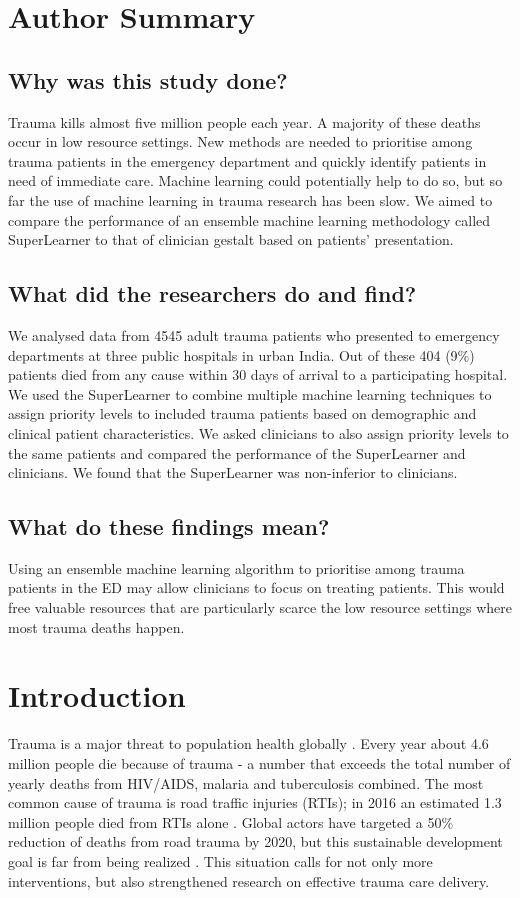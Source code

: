 \documentclass[10pt,letterpaper]{article}\usepackage[]{graphicx}\usepackage[]{color}
\begin{document}
\section*{Author Summary}
\subsection*{Why was this study done?}
Trauma kills almost five million people each year. A majority of these deaths
occur in low resource settings. New methods are needed to prioritise among
trauma patients in the emergency department and quickly identify patients in
need of immediate care. Machine learning could potentially help to do so, but so
far the use of machine learning in trauma research has been slow. We aimed to
compare the performance of an ensemble machine learning methodology called
SuperLearner to that of clinician gestalt based on patients’ presentation.

\subsection*{What did the researchers do and find?}
We analysed data from 4545 adult trauma
patients who presented to emergency departments at three public hospitals in
urban India. Out of these 404 (9\%) patients died from any
cause within 30 days of arrival to a participating hospital. We used the
SuperLearner to combine multiple machine learning techniques to assign priority
levels to included trauma patients based on demographic and clinical patient
characteristics. We asked clinicians to also assign priority levels to the same
patients and compared the performance of the SuperLearner and clinicians. We
found that the SuperLearner was non-inferior to clinicians.

\subsection*{What do these findings mean?}
Using an ensemble machine learning algorithm to prioritise among trauma patients
in the ED may allow clinicians to focus on treating patients. This would free
valuable resources that are particularly scarce the low resource settings where
most trauma deaths happen.

\linenumbers

\section*{Introduction}
Trauma is a major threat to population health globally
\cite{Brohi2017,GBD2017}. Every year about 4.6 million people die because of
trauma - a number that exceeds the total number of yearly deaths from HIV/AIDS,
malaria and tuberculosis combined. The most common cause of trauma is road
traffic injuries (RTIs); in 2016 an estimated 1.3 million people died from RTIs
alone \cite{GBD2017}. Global actors have targeted a 50\% reduction of deaths
from road trauma by 2020, but this sustainable development goal is far from
being realized \cite{UN2018}. This situation calls for not only more
interventions, but also strengthened research on effective trauma care delivery.
\end{document}
